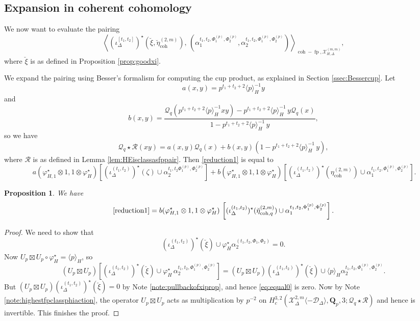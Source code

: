 \documentclass[cjm]{ipart}
\theoremstyle{plain}
\newtheorem{proposition}[theorem]{Proposition}
\theoremstyle{remark}
\DeclareMathOperator{\coh}{coh}
\DeclareMathOperator{\fp}{fp}
\newcommand{\QQ}{\mathbf{Q}}
\newcommand{\Qp}{\QQ_p}
\newcommand{\cD}{\mathcal{D}}
\newcommand{\cQ}{\mathcal{Q}}
\newcommand{\cR}{\mathcal{R}}
\newcommand{\cX}{\mathcal{X}}
\numberwithin{equation}{subsection}
\begin{document}
   \subsection{Expansion in coherent cohomology}



   We now want to evaluate the pairing
   \[ 	\left\langle \left(\iota^{[t_1,t_2]}_\Delta\right)^\star(\breve\xi,\breve\eta^{(2,m)}_{\coh}),\, \left( \alpha^{t_1,t_2,\Phi^{(p)}_1,\Phi^{(p)}_2}_1 , \alpha^{t_1,t_2,\Phi_1^{(p)},\Phi_2^{(p)}}_2\right)\right\rangle_{\coh-\fp,\cX^{(m,m)}_{H,\Delta}},\]
   where $\breve\xi$ is as defined in Proposition \ref{prop:goodxi}.

    We expand the pairing using Besser's formalism for computing the cup product, as explained in Section \ref{ssec:Bessercup}.  Let
   \[ a(x,y)=p^{t_1+t_2+2}\langle p\rangle^{-1}_Hy\]
   and
   \[ b(x,y)=\frac{\cQ_q\left(p^{t_1+t_2+2}\langle p\rangle^{-1}_Hxy\right)-p^{t_1+t_2+2}\langle p\rangle^{-1}_H\,y\cQ_q(x)}{1-p^{t_1+t_2+2}\langle p\rangle^{-1}_H\,y},\]
   so we have
   \[ \cQ_q\star \cR(xy)=a(x,y)\cQ_q(x)+b(x,y)\left(1-p^{t_1+t_2+2}\langle p\rangle^{-1}_H\,y\right),\]
   where $\cR$ is as defined in Lemma \ref{lem:HEisclassasfppair}.
   Then \eqref{reduction1} is equal to
   \begin{equation*}
     \ a(\varphi_{H,1}^\star\otimes 1,1\otimes \varphi_{H}^\star)\! \left[(\iota^{(t_1,t_2)}_\Delta)^\star(\zeta)\cup \alpha^{t_1,t_2\Phi^{(p)}_1,\Phi^{(p)}_2}_2\right] + b(\varphi_{H,1}^\star\otimes 1,1\otimes \varphi_{H}^\star)\! \left[(\iota^{(t_1,t_2)}_\Delta)^\star(\eta^{(2,m)}_{\coh})\cup \alpha^{t_1,t_2,\Phi^{(p)}_1,\Phi^{(p)}_2}_1\right].
    \end{equation*}

    \begin{proposition}\label{prop:evilterm0}
     We have
     \[ \text{\eqref{reduction1}}= b(\varphi_{H,1}^\star\otimes 1,1\otimes \varphi_H^\star)\, \left[(\iota^{(t_1,t_2)}_\Delta)^\star(\breve\eta^{(2,m)}_{\coh,q})\cup \alpha^{t_1,t_2,\Phi^{(p)}_1,\Phi^{(p)}_2}_1\right].\]
    \end{proposition}
    \begin{proof}
     We need to show that
     \[ (\iota^{(t_1,t_2)}_\Delta)^\star(\breve\xi)\cup \varphi_H^\star\alpha^{(t_1,t_2,\Phi_1,\Phi_2)}_2=0.\]
     Now $U_p\boxtimes U_p\circ\varphi_H^\star=\langle p\rangle_H$, %
     so
     \begin{equation}\label{eq:equal0}
       (U_p\boxtimes U_p)\left[(\iota^{(t_1,t_2)}_\Delta)^\star(\breve\xi)\cup \varphi_H^\star\,\alpha^{t_1,t_2,\Phi^{(p)}_1,\Phi^{(p)}_2}_2\right]=(U_p\boxtimes U_p)(\iota^{(t_1,t_2)}_\Delta)^\star(\breve\xi)\cup \langle p\rangle_H\alpha^{t_1,t_2,\Phi^{(p)}_1,\Phi^{(p)}_2}_2.
      \end{equation}
     But $(U_p\boxtimes U_p)(\iota^{(t_1,t_2)}_\Delta)^\star(\breve\xi)=0$ by Note \ref{note:pullbackofxiprop}, and hence \eqref{eq:equal0} is zero. Now by Note \ref{note:highestfpclassphiaction}, the operator  $U_p\boxtimes U_p$ acts as multiplication by $p^{-2}$ on $H^{3,2}_c(\cX_\Delta^{2,m}\langle -\cD_\Delta\rangle,\Qp,3;\cQ_q\star \cR)$ and hence is invertible. This finishes the proof.
    \end{proof}
\end{document}
